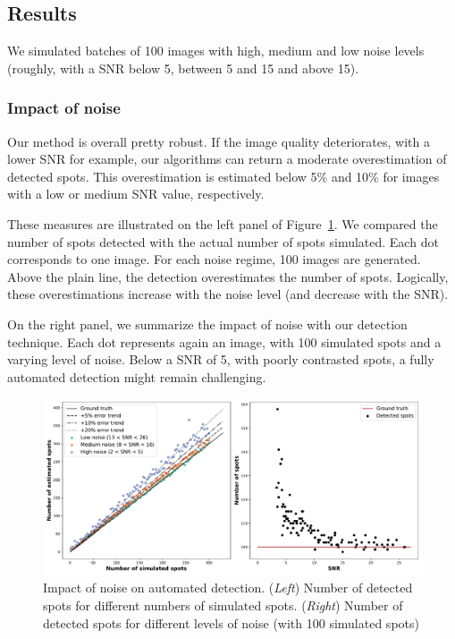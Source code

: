 \subsection{Results}
\label{subsec:detection_results}

We simulated batches of 100 images with high, medium and low noise levels (roughly, with a \ac{SNR} below 5, between 5 and 15 and above 15).

\subsubsection{Impact of noise}

Our method is overall pretty robust.
If the image quality deteriorates, with a lower \ac{SNR} for example, our algorithms can return a moderate overestimation of detected spots.
This overestimation is estimated below 5\% and 10\% for images with a low or medium \ac{SNR} value, respectively.

These measures are illustrated on the left panel of Figure~\ref{fig:detection_error}.
We compared the number of spots detected with the actual number of spots simulated.
Each dot corresponds to one image.
For each noise regime, 100 images are generated.
Above the plain line, the detection overestimates the number of spots.
Logically, these overestimations increase with the noise level (and decrease with the \ac{SNR}).

On the right panel, we summarize the impact of noise with our detection technique.
Each dot represents again an image, with 100 simulated spots and a varying level of noise.
Below a \ac{SNR} of 5, with poorly contrasted spots, a fully automated detection might remain challenging.

\begin{figure}[h]
    \centering
    \includegraphics[width=1\textwidth]{figures/chapter2/fused_spot_detection_noise}
    \caption{Impact of noise on automated detection.
	(\textit{Left}) Number of detected spots for different numbers of simulated spots.
	(\textit{Right}) Number of detected spots for different levels of noise (with 100 simulated spots)}
    \label{fig:detection_error}
\end{figure}

